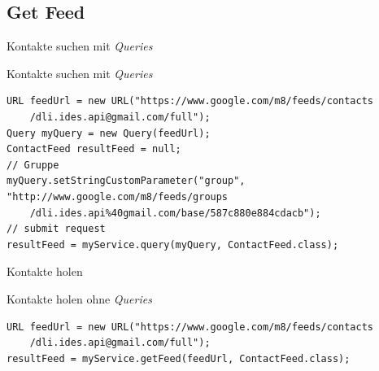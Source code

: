 \subsection*{Get Feed}

\begin{frame}[fragile]{Kontakte suchen mit \emph{Queries}}
\begin{block}{Kontakte suchen mit \emph{Queries}}
\javalstset
\begin{lstlisting}
URL feedUrl = new URL("https://www.google.com/m8/feeds/contacts
	/dli.ides.api@gmail.com/full");
Query myQuery = new Query(feedUrl);
ContactFeed resultFeed = null;
// Gruppe
myQuery.setStringCustomParameter("group", "http://www.google.com/m8/feeds/groups
	/dli.ides.api%40gmail.com/base/587c880e884cdacb");
// submit request
resultFeed = myService.query(myQuery, ContactFeed.class);
\end{lstlisting}
\end{block}
\end{frame}

\begin{frame}[fragile]{Kontakte holen}
\begin{block}{Kontakte holen ohne \emph{Queries}}
\javalstset
\begin{lstlisting}
URL feedUrl = new URL("https://www.google.com/m8/feeds/contacts
	/dli.ides.api@gmail.com/full");
resultFeed = myService.getFeed(feedUrl, ContactFeed.class);
\end{lstlisting}
\end{block}
\end{frame}
